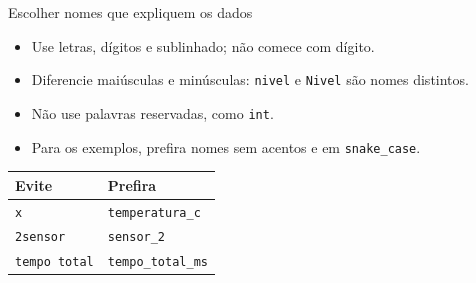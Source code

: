 \begin{frame}{Escolher nomes que expliquem os dados}
\begin{itemize}
\item Use letras, dígitos e sublinhado; não comece com dígito.
\item Diferencie maiúsculas e minúsculas: \texttt{nivel} e \texttt{Nivel} são nomes distintos.
\item Não use palavras reservadas, como \texttt{int}.
\item Para os exemplos, prefira nomes sem acentos e em \texttt{snake\_case}.
\end{itemize}
\begin{center}
\begin{tabular}{ll}
\toprule
Evite & Prefira \\
\midrule
\texttt{x} & \texttt{temperatura\_c} \\
\texttt{2sensor} & \texttt{sensor\_2} \\
\texttt{tempo total} & \texttt{tempo\_total\_ms} \\
\bottomrule
\end{tabular}
\end{center}
\end{frame}
